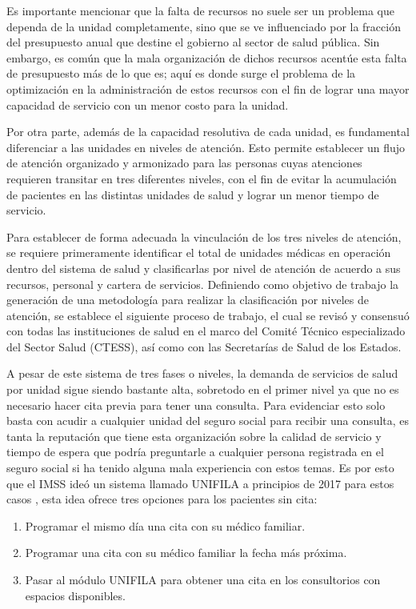 \documentclass[10pt]{article}
\begin{document}
    Es importante mencionar que la falta de recursos no suele ser un problema que dependa de la unidad completamente, sino que se ve influenciado por la fracción del presupuesto anual que destine el gobierno al sector de salud pública. Sin embargo, es común que la mala organización de dichos recursos acentúe esta falta de presupuesto más de lo que es; aquí es donde surge el problema de la optimización en la administración de estos recursos con el fin de lograr una mayor capacidad de servicio con un menor costo para la unidad.
    
    Por otra parte, además de la capacidad resolutiva de cada unidad, es fundamental diferenciar a las unidades en niveles de atención. Esto permite establecer un flujo de atención organizado y armonizado para las personas cuyas atenciones requieren transitar en tres diferentes niveles, con el fin de evitar la acumulación de pacientes en las distintas unidades de salud y lograr un menor tiempo de servicio.
    
    Para establecer de forma adecuada la vinculación de los tres niveles de atención, se requiere primeramente identificar el total de unidades médicas en operación dentro del sistema de salud y clasificarlas por nivel de atención de acuerdo a sus recursos, personal y cartera de servicios. Definiendo como objetivo de trabajo la generación de una metodología para realizar la clasificación por niveles de atención, se establece el siguiente proceso de trabajo, el cual se revisó y consensuó con todas las instituciones de salud en el marco del Comité Técnico especializado del Sector Salud (CTESS), así como con las Secretarías de Salud de los Estados.
    
    A pesar de este sistema de tres fases o niveles, la demanda de servicios de salud por unidad sigue siendo bastante alta, sobretodo en el primer nivel ya que no es necesario hacer cita previa para tener una consulta. Para evidenciar esto solo basta con acudir a cualquier unidad del seguro social para recibir una consulta, es tanta la reputación que tiene esta organización sobre la calidad de servicio y tiempo de espera que podría preguntarle a cualquier persona registrada en el seguro social si ha tenido alguna mala experiencia con estos temas. Es por esto que el IMSS ideó un sistema llamado UNIFILA a principios de 2017 para estos casos \cite{UNIFILA}, esta idea ofrece tres opciones para los pacientes sin cita:
    \begin{enumerate}
    	\item Programar el mismo día una cita con su médico familiar.
    	\item Programar una cita con su médico familiar la fecha más próxima.
    	\item Pasar al módulo UNIFILA para obtener una cita en los consultorios con espacios disponibles.
    \end{enumerate}
    
\end{document}
